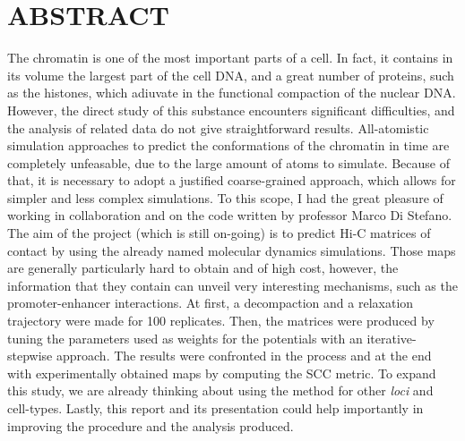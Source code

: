 \graphicspath{{images/}}
\newpage
\section{ABSTRACT}

The chromatin is one of the most important parts of a cell. In fact, it contains in its volume the largest part of the cell DNA, and a great number of proteins, such as the histones, which adiuvate in the functional compaction of the nuclear DNA. However, the direct study of this substance encounters significant difficulties, and the analysis of related data do not give straightforward results. All-atomistic simulation approaches to predict the conformations of the chromatin in time are completely unfeasable, due to the large amount of atoms to simulate. Because of that, it is necessary to adopt a justified coarse-grained approach, which allows for simpler and less complex simulations. To this scope, I had the great pleasure of working in collaboration and on the code written by professor Marco Di Stefano. 
The aim of the project (which is still on-going) is to predict Hi-C matrices of contact by using the already named molecular dynamics simulations. Those maps are generally particularly hard to obtain and of high cost, however, the information that they contain can unveil very interesting mechanisms, such as the promoter-enhancer interactions.
At first, a decompaction and a relaxation trajectory were made for 100 replicates. Then, the matrices were produced by tuning the parameters used as weights for the potentials with an iterative-stepwise approach. The results were confronted in the process and at the end with experimentally obtained maps by computing the SCC metric.
To expand this study, we are already thinking about using the method for other \textit{loci} and cell-types.
Lastly, this report and its presentation could help importantly in improving the procedure and the analysis produced.
